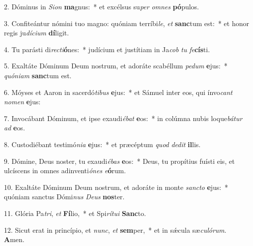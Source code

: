 2. Dóminus in \textit{Si}\textit{on} \textbf{ma}gnus:~*  et excélsus su\textit{per} \textit{om}\textit{nes} \textbf{pó}pulos.\

3. Confiteántur nómini tuo magno: quóniam terríbi\textit{le}, \textit{et} \textbf{sanc}tum est:~*  et honor regis ju\textit{dí}\textit{ci}\textit{um} \textbf{dí}ligit.\

4. Tu parásti di\textit{rec}\textit{ti}\textbf{ó}nes:~*  judícium et justítiam in Ja\textit{cob} \textit{tu} \textit{fe}\textbf{cís}ti.\

5. Exaltáte Dóminum Deum nostrum, et adoráte scabéllum \textit{pe}\textit{dum} \textbf{e}jus:~*  \textit{quón}\textit{i}\textit{am} \textbf{sanc}tum est.\

6. Móyses et Aaron in sacerdó\textit{ti}\textit{bus} \textbf{e}jus:~*  et Sámuel inter eos, qui ínvo\textit{cant} \textit{no}\textit{men} \textbf{e}jus:\

7. Invocábant Dóminum, et ipse exaudi\textit{é}\textit{bat} \textbf{e}os:~*  in colúmna nubis loque\textit{bá}\textit{tur} \textit{ad} \textbf{e}os.\

8. Custodiébant testimó\textit{ni}\textit{a} \textbf{e}jus:~*  et præcéptum \textit{quod} \textit{de}\textit{dit} \textbf{il}lis.\

9. Dómine, Deus noster, tu exaudi\textit{é}\textit{bas} \textbf{e}os:~*  Deus, tu propítius fuísti eis, et ulcíscens in omnes adinventi\textit{ó}\textit{nes} \textit{e}\textbf{ó}rum.\

10. Exaltáte Dóminum Deum nostrum, et adoráte in monte \textit{sanc}\textit{to} \textbf{e}jus:~*  quóniam sanctus Dómi\textit{nus} \textit{De}\textit{us} \textbf{nos}ter.\

11. Glória Pa\textit{tri}, \textit{et} \textbf{Fí}lio,~*  et Spi\textit{rí}\textit{tu}\textit{i} \textbf{Sanc}to.\

12. Sicut erat in princípio, et \textit{nunc}, \textit{et} \textbf{sem}per,~*  et in sǽcula sæ\textit{cu}\textit{ló}\textit{rum}. \textbf{A}men.\

